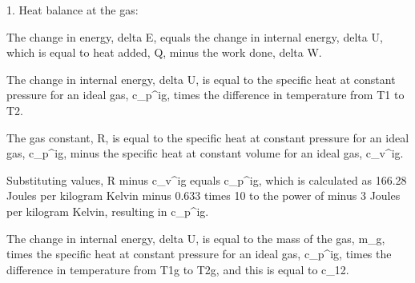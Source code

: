 1. Heat balance at the gas:

The change in energy, delta E, equals the change in internal energy, delta U, which is equal to heat added, Q, minus the work done, delta W.

The change in internal energy, delta U, is equal to the specific heat at constant pressure for an ideal gas, c_p^ig, times the difference in temperature from T1 to T2.

The gas constant, R, is equal to the specific heat at constant pressure for an ideal gas, c_p^ig, minus the specific heat at constant volume for an ideal gas, c_v^ig.

Substituting values, R minus c_v^ig equals c_p^ig, which is calculated as 166.28 Joules per kilogram Kelvin minus 0.633 times 10 to the power of minus 3 Joules per kilogram Kelvin, resulting in c_p^ig.

The change in internal energy, delta U, is equal to the mass of the gas, m_g, times the specific heat at constant pressure for an ideal gas, c_p^ig, times the difference in temperature from T1g to T2g, and this is equal to c_12.